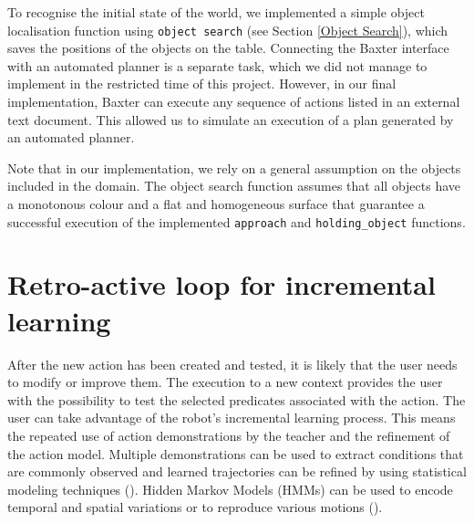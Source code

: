 To recognise the initial state of the world, we implemented a simple object localisation function using \texttt{object search} (see Section \ref{Object Search}), which saves the positions of the objects on the table.
Connecting the Baxter interface with an automated planner is a separate task, which we did not manage to implement in the restricted time of this project.
However, in our final implementation, Baxter can execute any sequence of actions listed in an external text document.
This allowed us to simulate an execution of a plan generated by an automated planner.

Note that in our implementation, we rely on a general assumption on the objects included in the domain.
The object search function assumes that all objects have a monotonous colour and a flat and homogeneous surface that guarantee a successful execution of the implemented \texttt{approach} and \texttt{holding_object} functions.



%

\section{Retro-active loop for incremental learning}
After the new action has been created and tested, it is likely that the user needs to modify or improve them.
The execution to a new context provides the user with the possibility to test the selected predicates associated with the action.
The user can take advantage of the robot's incremental learning process.
This means the repeated use of action demonstrations by the teacher and the refinement of the action model.
Multiple demonstrations can be used to extract conditions that are commonly observed and learned trajectories can be refined by using statistical modeling techniques (\cite{ude1993trajectory}).
Hidden Markov Models (HMMs) can be used to encode temporal and spatial variations or to reproduce various motions (\cite{tso1996hidden}).
